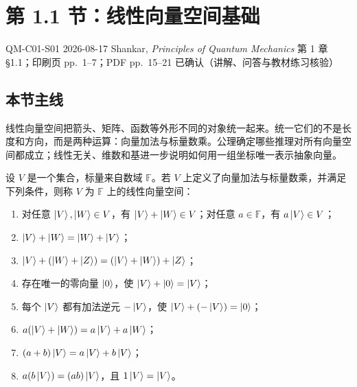 
\section{第 1.1 节：线性向量空间基础}
\label{section:QM-C01-S01}

\studymeta
  {QM-C01-S01}
  {2026-08-17}
  {Shankar, \textit{Principles of Quantum Mechanics}}
  {第 1 章 \S 1.1；印刷页 pp.~1--7；PDF pp.~15--21}
  {已确认（讲解、问答与教材练习核验）}

\subsection{本节主线}

线性向量空间把箭头、矩阵、函数等外形不同的对象统一起来。统一它们的不是长度和方向，而是两种运算：向量加法与标量数乘。公理确定哪些推理对所有向量空间都成立；线性无关、维数和基进一步说明如何用一组坐标唯一表示抽象向量。



\begin{definition}
设 $V$ 是一个集合，标量来自数域 $\mathbb{F}$。若 $V$ 上定义了向量加法与标量数乘，并满足下列条件，则称 $V$ 为 $\mathbb{F}$ 上的线性向量空间：
\begin{enumerate}
  \item 对任意 $\left|V\right\rangle,\left|W\right\rangle\in V$，有 $\left|V\right\rangle+\left|W\right\rangle\in V$；对任意 $a\in\mathbb{F}$，有 $a\left|V\right\rangle\in V$；
  \item $\left|V\right\rangle+\left|W\right\rangle=\left|W\right\rangle+\left|V\right\rangle$；
  \item $\left|V\right\rangle+(\left|W\right\rangle+\left|Z\right\rangle)=(\left|V\right\rangle+\left|W\right\rangle)+\left|Z\right\rangle$；
  \item 存在唯一的零向量 $\left|0\right\rangle$，使 $\left|V\right\rangle+\left|0\right\rangle=\left|V\right\rangle$；
  \item 每个 $\left|V\right\rangle$ 都有加法逆元 $-\left|V\right\rangle$，使 $\left|V\right\rangle+(-\left|V\right\rangle)=\left|0\right\rangle$；
  \item $a(\left|V\right\rangle+\left|W\right\rangle)=a\left|V\right\rangle+a\left|W\right\rangle$；
  \item $(a+b)\left|V\right\rangle=a\left|V\right\rangle+b\left|V\right\rangle$；
  \item $a(b\left|V\right\rangle)=(ab)\left|V\right\rangle$，且 $1\left|V\right\rangle=\left|V\right\rangle$。
\end{enumerate}
\end{definition}

